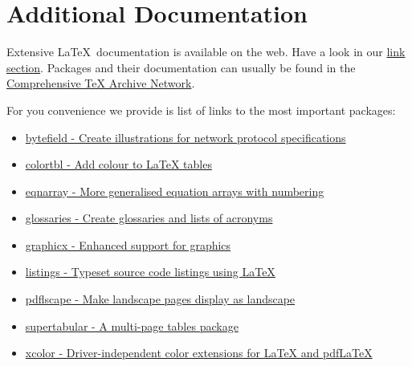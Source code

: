 \newpage
\section{Additional Documentation}

Extensive \LaTeX\ documentation is available on the web.
Have a look in our \href{http://cst.mi.fu-berlin.de/links/technical-writing.html}{link section}.
Packages and their documentation can usually be found in the \href{http://www.ctan.org/}{Comprehensive TeX Archive Network}.

For you convenience we provide is list of links to the most important packages:
\begin{itemize}
	\item \href{http://tug.ctan.org/cgi-bin/ctanPackageInformation.py?id=bytefield}{bytefield - Create illustrations for network protocol specifications}
	\item \href{http://tug.ctan.org/cgi-bin/ctanPackageInformation.py?id=colortbl}{colortbl - Add colour to LaTeX tables}
	\item \href{http://tug.ctan.org/cgi-bin/ctanPackageInformation.py?id=eqnarray}{eqnarray - More generalised equation arrays with numbering}
	\item \href{http://tug.ctan.org/cgi-bin/ctanPackageInformation.py?id=glossaries}{glossaries - Create glossaries and lists of acronyms}
	\item \href{http://tug.ctan.org/cgi-bin/ctanPackageInformation.py?id=graphicx}{graphicx - Enhanced support for graphics}
	\item \href{http://tug.ctan.org/cgi-bin/ctanPackageInformation.py?id=listings}{listings - Typeset source code listings using LaTeX}
	\item \href{http://tug.ctan.org/cgi-bin/ctanPackageInformation.py?id=pdflscape}{pdflscape - Make landscape pages display as landscape}
	\item \href{http://tug.ctan.org/cgi-bin/ctanPackageInformation.py?id=supertabular}{supertabular - A multi-page tables package}
	\item \href{http://tug.ctan.org/cgi-bin/ctanPackageInformation.py?id=xcolor}{xcolor - Driver-independent color extensions for LaTeX and pdfLaTeX}
\end{itemize}

